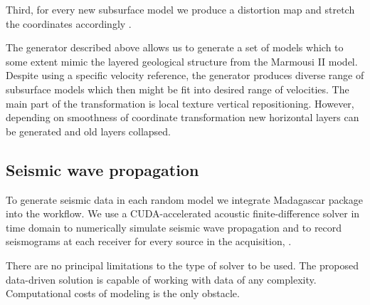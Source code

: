 \documentclass[manuscript]{geophysics}
\begin{document}


Third, for every new subsurface model we produce a distortion map  and stretch the coordinates accordingly .


The generator described above allows us to generate a set of models which to some extent mimic the layered geological structure from the Marmousi II model. Despite using a specific velocity reference, the generator produces diverse range of subsurface models which then might be fit into desired range of velocities. The main part of the transformation is local texture vertical repositioning. However, depending on smoothness of coordinate transformation new horizontal layers can be generated and old layers collapsed.

\subsection{Seismic wave propagation}
To generate seismic data in each random model we integrate Madagascar package into the workflow. We use a CUDA-accelerated acoustic finite-difference solver in time domain to numerically simulate seismic wave propagation and to record seismograms at each receiver for every source in the acquisition, .

There are no principal limitations to the type of solver to be used. The proposed data-driven solution is capable of working with data of any complexity. Computational costs of modeling is the only obstacle.



\end{document}
